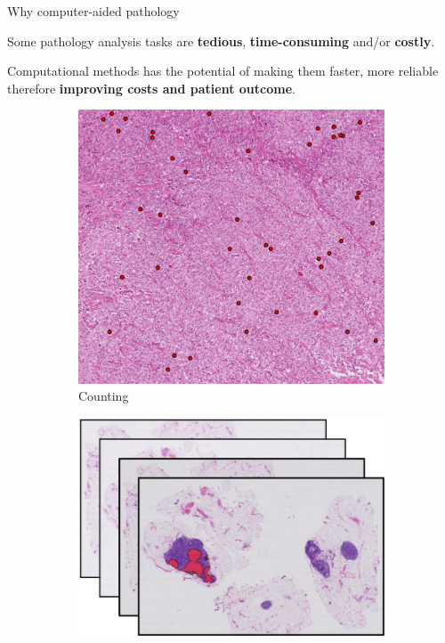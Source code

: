\documentclass{beamer}
\begin{document}
\begin{frame}{Why computer-aided pathology}

\vfill

Some pathology analysis tasks are \textbf{tedious}, \textbf{time-consuming} and/or \textbf{costly}. 

Computational methods has the potential of making them faster, more reliable therefore \textbf{improving costs and patient outcome}. 

\vfill

\begin{figure}
	\begin{subfigure}{0.25\textwidth}
		\centering
		\includegraphics[width=\textwidth]{images/mitosis_zoomout.png}
		\caption{Counting}
	\end{subfigure}
	\begin{subfigure}{0.25\textwidth}
		\centering
		\vfill
		\includegraphics[width=\textwidth]{images/highdatavolume.png}

\end{subfigure}
\end{figure}
\end{frame}
\end{document}
